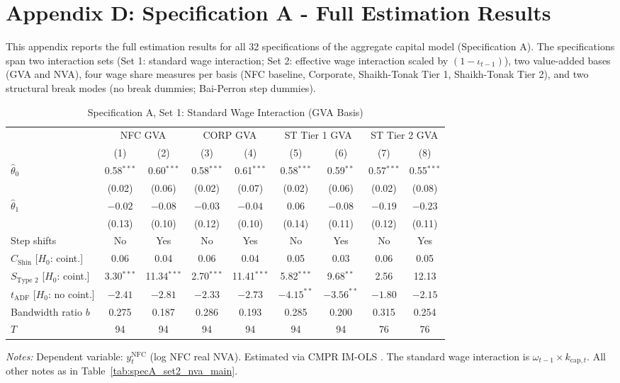 \section{Appendix D: Specification A - Full Estimation Results}
\label{app:specA_full_results}

This appendix reports the full estimation results for all 32
specifications of the aggregate capital model (Specification A).
The specifications span two interaction sets (Set 1: standard wage
interaction; Set 2: effective wage interaction scaled by
$(1-\iota_{t-1})$), two value-added bases (GVA and NVA), four wage
share measures per basis (NFC baseline, Corporate, Shaikh-Tonak
Tier 1, Shaikh-Tonak Tier 2), and two structural break modes (no
break dummies; Bai-Perron step dummies).

\begin{table}[htbp]
	\centering
	\caption{Specification A, Set 1: Standard Wage Interaction (GVA Basis)}
	\label{tab:specA_set1_gva_app}
	\small
	\begin{tabular}{@{}lcccccccc@{}}
		\toprule
		& \multicolumn{2}{c}{NFC GVA} & \multicolumn{2}{c}{CORP GVA} & \multicolumn{2}{c}{ST Tier 1 GVA} & \multicolumn{2}{c}{ST Tier 2 GVA} \\
		\cmidrule(lr){2-3} \cmidrule(lr){4-5} \cmidrule(lr){6-7} \cmidrule(lr){8-9}
		& (1) & (2) & (3) & (4) & (5) & (6) & (7) & (8) \\
		\midrule
		$\hat{\theta}_0$ & 0.58$^{***}$ & 0.60$^{***}$ & 0.58$^{***}$ & 0.61$^{***}$ & 0.58$^{***}$ & 0.59$^{**}$ & 0.57$^{***}$ & 0.55$^{***}$ \\
		& (0.02) & (0.06) & (0.02) & (0.07) & (0.02) & (0.06) & (0.02) & (0.08) \\
		$\hat{\theta}_1$ & $-0.02$ & $-0.08$ & $-0.03$ & $-0.04$ & 0.06 & $-0.08$ & $-0.19$ & $-0.23$ \\
		& (0.13) & (0.10) & (0.12) & (0.10) & (0.14) & (0.11) & (0.12) & (0.11) \\
		\midrule
		Step shifts & No & Yes & No & Yes & No & Yes & No & Yes \\
		$C_{\text{Shin}}$ [$H_0$: coint.] & 0.06 & 0.04 & 0.06 & 0.04 & 0.05 & 0.03 & 0.06 & 0.05 \\
		$S_{\text{Type 2}}$ [$H_0$: coint.] & 3.30$^{***}$ & 11.34$^{***}$ & 2.70$^{***}$ & 11.41$^{***}$ & 5.82$^{***}$ & 9.68$^{**}$ & 2.56 & 12.13 \\
		$t_{\text{ADF}}$ [$H_0$: no coint.] & $-2.41$ & $-2.81$ & $-2.33$ & $-2.73$ & $-4.15^{**}$ & $-3.56^{**}$ & $-1.80$ & $-2.15$ \\
		Bandwidth ratio $b$ & 0.275 & 0.187 & 0.286 & 0.193 & 0.285 & 0.200 & 0.315 & 0.254 \\
		$T$ & 94 & 94 & 94 & 94 & 94 & 94 & 76 & 76 \\
		\bottomrule
	\end{tabular}
	\begin{minipage}{\textwidth}
		\scriptsize
		\textit{Notes:} Dependent variable: $y_t^{\text{NFC}}$ (log NFC real NVA). Estimated via CMPR IM-OLS \citep{VogelsangWagner2024}. The standard wage interaction is $\omega_{t-1} \times k_{\text{cap},t}$. All other notes as in Table~\ref{tab:specA_set2_nva_main}.
	\end{minipage}
\end{table}

